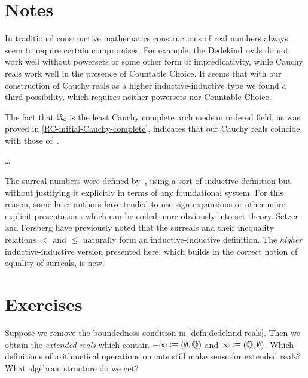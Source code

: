 \section*{Notes}
\label{sec:reals-notes}

In traditional constructive mathematics constructions of real numbers always seem to
require certain compromises. For example, the Dedekind reals do not work well without
powersets or some other form of impredicativity, while Cauchy reals work well in the
presence of Countable Choice. It seems that with our construction of Cauchy reals as a
higher inductive-inductive type we found a third possibility, which requires neither
powersets nor Countable Choice.

The fact that $\mathbb{R}_\mathsf{c}$ is the least Cauchy complete archimedean ordered field, as was proved
in \autoref{RC-initial-Cauchy-complete}, indicates that our Cauchy reals coincide with
those of~\cite{EscardoSimpson:01}.


\dots

The surreal numbers were defined by~\cite{conway:onag}, using a sort of inductive definition but without justifying it explicitly in terms of any foundational system.
For this reason, some later authors have tended to use sign-expansions or other more explicit presentations which can be coded more obviously into set theory.
Setzer and Forsberg have previously noted that the surreals and their inequality relations $<$ and $\le$ naturally form an inductive-inductive definition.
The \emph{higher} inductive-inductive version presented here, which builds in the correct notion of equality of surreals, is new.


\section*{Exercises}
\label{sec:reals-exercises}

\begin{ex} \label{ex:RD-extended-reals}
  Suppose we remove the boundedness condition in \autoref{defn:dedekind-reals}.
  Then we obtain the \emph{extended reals} which contain $-\infty \vcentcolon\equiv
  (\emptyset, \mathbb{Q})$ and $\infty \vcentcolon\equiv (\mathbb{Q}, \emptyset)$. Which definitions of arithmetical
  operations on cuts still make sense for extended reals? What algebraic structure do we
  get?
\end{ex}

